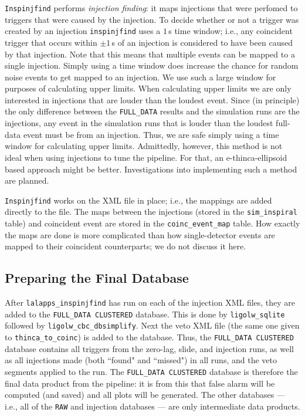 \verb|Inspinjfind| performs \emph{injection finding}: it maps injections that
were perfomed to triggers that were caused by the injection. To decide whether
or not a trigger was created by an injection \verb|inspinjfind| uses a $1\,$s
time window; i.e., any coincident trigger that occurs within $\pm 1\,$s of an
injection is considered to have been caused by that injection. Note that this
means that multiple events can be mapped to a single injection. Simply using a
time window does increase the chance for random noise events to get mapped to
an injection. We use such a large window for purposes of calculating upper
limits. When calculating upper limits we are only interested in injections that
are louder than the loudest event. Since (in principle) the only difference
between the \verb|FULL_DATA| results and the simulation runs are the
injections, any event in the simulation runs that is louder than the loudest
full-data event must be from an injection. Thus, we are safe simply using a
time window for calculating upper limits. Admittedly, however, this method is
not ideal when using injections to tune the pipeline. For that, an
e-thinca-ellipsoid based approach might be better. Investigations into
implementing such a method are planned.

\verb|Inspinjfind| works on the XML file in place; i.e., the mappings are added
directly to the file. The maps between the injections (stored in the
\verb|sim_inspiral| table) and coincident event are stored in the
\verb|coinc_event_map| table. How exactly the maps are done is more complicated
than how single-detector events are mapped to their coincident counterparts; we
do not discuss it here.

\subsection{Preparing the Final Database}
\label{sec:compute_durations}

After \verb|lalapps_inspinjfind| has run on each of the injection XML files,
they are added to the \verb|FULL_DATA CLUSTERED| database. This is done by
\verb|ligolw_sqlite| followed by \verb|ligolw_cbc_dbsimplify|. Next the veto
XML file (the same one given to \verb|thinca_to_coinc|) is added to the
database. Thus, the \verb|FULL_DATA CLUSTERED| database contains all triggers
from the zero-lag, slide, and injection runs, as well as all injections made
(both ``found" and ``missed") in all runs, and the veto segments applied to the
run. The \verb|FULL_DATA CLUSTERED| database is therefore the final data
product from the pipeline: it is from this that false alarm will be computed
(and saved) and all plots will be generated. The other databases --- i.e., all
of the \verb|RAW| and injection databases --- are only intermediate data
products.

